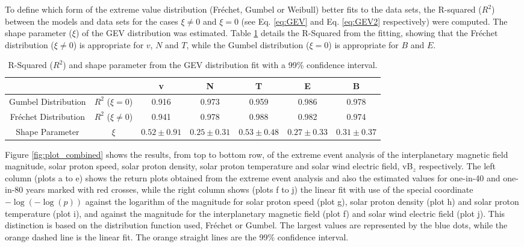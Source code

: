 \documentclass{article}
\begin{document}
To define which form of the extreme value distribution (Fréchet, Gumbel or Weibull) better fits to the data sets, the R-squared ($R^{2}$) between the models and data sets for the cases $\xi\ne0$ and $\xi=0$ (see Eq. \ref{eq:GEV} and Eq. \ref{eq:GEV2} respectively) were computed. The shape parameter ($\xi$) of the GEV distribution was estimated. 
Table \ref{tab:extreme_values_s_wind} details the R-Squared from the fitting, showing that the Fréchet distribution ($\xi\ne0$) is appropriate for $v$, $N$ and $T$, while the Gumbel distribution ($\xi=0$) is appropriate for $B$ and $E$.

\begin{table}[!htb]
\centering
\begin{tabular}{ccccccc}\toprule
        & &v&N&T&E&B \\ \midrule
        Gumbel Distribution&$R^{2}$ ($\xi=0$)&0.916&0.973&0.959&0.986& 0.978 \\
        Fréchet Distribution&$R^{2}$ ($\xi\ne0$)&0.941&0.978&0.988&0.982 & 0.974 \\
        Shape Parameter&$\xi$ &$0.52\pm0.91$&$0.25\pm0.31$&$0.53\pm0.48$&$0.27\pm0.33$& $0.31\pm0.37$\\
        \bottomrule
\end{tabular}
\caption{R-Squared ($R^{2}$) and shape parameter from the GEV distribution fit with a 99\% confidence interval.}
\label{tab:extreme_values_s_wind}
\end{table}

Figure \ref{fig:plot_combined} shows the results, from top to bottom row, of the extreme event analysis of the interplanetary magnetic field magnitude, solar proton speed, solar proton density, solar proton temperature and solar wind electric field, vB$_{z}$ respectively. The left column (plots a to e) shows the return plots obtained from the extreme event analysis and also the estimated values for one-in-40 and one-in-80 years marked with red crosses, while the right column shows (plots f to j) the linear fit with use of the special coordinate $-\log(-\log(p))$ against the logarithm of the magnitude for solar proton speed (plot g), solar proton density (plot h) and solar proton temperature (plot i), and against the magnitude for the interplanetary magnetic field (plot f) and solar wind electric field (plot j). This distinction is based on the distribution function used, Fréchet or Gumbel. The largest values are represented by the blue dots, while the orange dashed line is the linear fit. The orange straight lines are the 99\% confidence interval.
\end{document}

